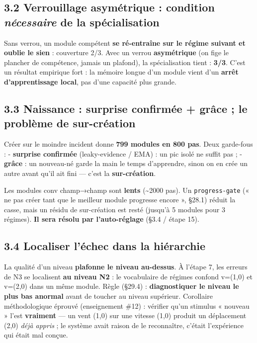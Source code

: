 \documentclass[
  french,
  11pt,
]{article}
\begin{document}
\subsection{\texorpdfstring{3.2 Verrouillage asymétrique : condition
\emph{nécessaire} de la
spécialisation}{3.2 Verrouillage asymétrique : condition nécessaire de la spécialisation}}\label{verrouillage-asymuxe9trique-condition-nuxe9cessaire-de-la-spuxe9cialisation}

Sans verrou, un module compétent \textbf{se ré-entraîne sur le régime
suivant et oublie le sien} : couverture 2/3. Avec un verrou
\textbf{asymétrique} (on fige le plancher de compétence, jamais un
plafond), la spécialisation tient : \textbf{3/3}. C'est un résultat
empirique fort : la mémoire longue d'un module vient d'un \textbf{arrêt
d'apprentissage local}, pas d'une capacité plus grande.

\subsection{\texorpdfstring{3.3 Naissance : surprise \textbf{confirmée}
+ \textbf{grâce} ; le problème de
sur-création}{3.3 Naissance : surprise confirmée + grâce ; le problème de sur-création}}\label{naissance-surprise-confirmuxe9e-gruxe2ce-le-probluxe8me-de-sur-cruxe9ation}

Créer sur le moindre incident donne \textbf{799 modules en 800 pas}.
Deux garde-fous : - \textbf{surprise confirmée} (leaky-evidence / EMA) :
un pic isolé ne suffit pas ; - \textbf{grâce} : un nouveau-né garde la
main le temps d'apprendre, sinon on en crée un autre avant qu'il ait
fini --- c'est la \textbf{sur-création}.

Les modules conv champ→champ sont \textbf{lents} (\textasciitilde2000
pas). Un \texttt{progress-gate} (« ne pas créer tant que le meilleur
module progresse encore », §28.1) réduit la casse, mais un résidu de
sur-création est resté (jusqu'à 5 modules pour 3 régimes). \textbf{Il
sera résolu par l'auto-réglage} (§3.4 / étape 15).

\subsection{3.4 Localiser l'échec dans la
hiérarchie}\label{localiser-luxe9chec-dans-la-hiuxe9rarchie}

La qualité d'un niveau \textbf{plafonne le niveau au-dessus}. À l'étape
7, les erreurs de N3 se localisent \textbf{au niveau N2} : le
vocabulaire de régimes confond v=(1,0) et v=(2,0) dans un même module.
Règle (§29.4) : \textbf{diagnostiquer le niveau le plus bas anormal}
avant de toucher au niveau supérieur. Corollaire méthodologique éprouvé
(enseignement \#12) : vérifier qu'un stimulus « nouveau » l'est
\textbf{vraiment} --- un vent (1,0) sur une vitesse (1,0) produit un
déplacement (2,0) \emph{déjà appris} ; le système avait raison de le
reconnaître, c'était l'expérience qui était mal conçue.
\end{document}
